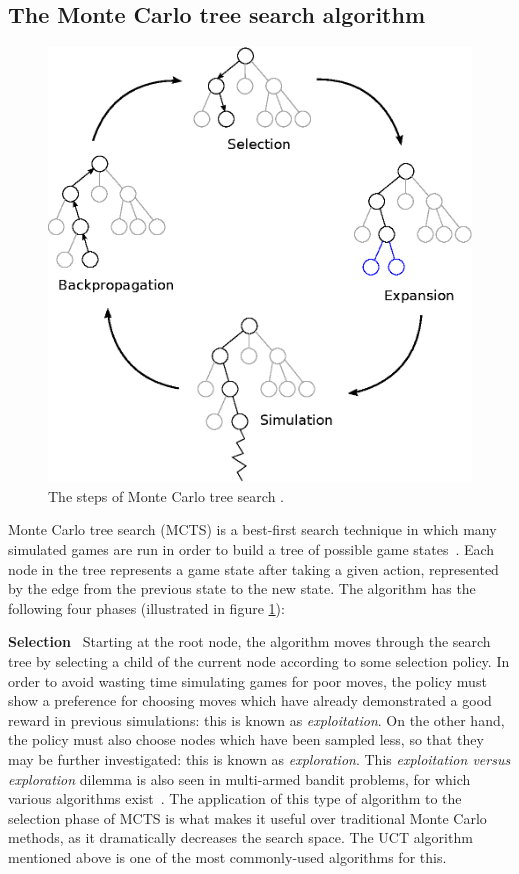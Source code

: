 \subsection{The Monte Carlo tree search algorithm}

\begin{figure}
\includegraphics[width=\linewidth]{diagrams/mcts}
\caption[The steps of Monte Carlo tree search]{The steps of Monte Carlo tree search \cite{Chaslot2008}. }
\label{fig:MCTS}
\end{figure}

Monte Carlo tree search (MCTS) is a best-first search technique in which many simulated games are run in order to build a tree of possible game states~\citep{Chaslot2008}.  Each node in the tree represents a game state after taking a given action, represented by the edge from the previous state to the new state.  The algorithm has the following four phases (illustrated in figure \ref{fig:MCTS}):

\textbf{Selection} ~Starting at the root node, the algorithm moves through the search tree by selecting a child of the current node according to some selection policy.  In order to avoid wasting time simulating games for poor moves, the policy must show a preference for choosing moves which have already demonstrated a good reward in previous simulations: this is known as \emph{exploitation}.  On the other hand, the policy must also choose nodes which have been sampled less, so that they may be further investigated: this is known as \emph{exploration}.  This \emph{exploitation versus exploration} dilemma is also seen in multi-armed bandit problems, for which various algorithms exist~\citep{Auer2002}.  The application of this type of algorithm to the selection phase of MCTS is what makes it useful over traditional Monte Carlo methods, as it dramatically decreases the search space.  The UCT algorithm~\citep{Kocsis2006} mentioned above is one of the most commonly-used algorithms for this.

